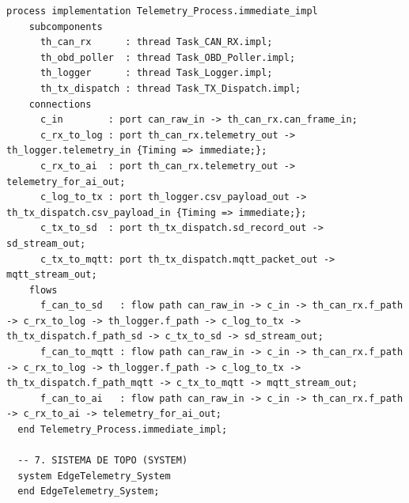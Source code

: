 \begin{lstlisting}[language=AADL, caption={Modelo textual AADL completo consolidado (\texttt{EdgeTelemetryLayer.aadl}).}]
  process implementation Telemetry_Process.immediate_impl
    subcomponents
      th_can_rx      : thread Task_CAN_RX.impl;
      th_obd_poller  : thread Task_OBD_Poller.impl;
      th_logger      : thread Task_Logger.impl;
      th_tx_dispatch : thread Task_TX_Dispatch.impl;
    connections
      c_in        : port can_raw_in -> th_can_rx.can_frame_in;
      c_rx_to_log : port th_can_rx.telemetry_out -> th_logger.telemetry_in {Timing => immediate;};
      c_rx_to_ai  : port th_can_rx.telemetry_out -> telemetry_for_ai_out;
      c_log_to_tx : port th_logger.csv_payload_out -> th_tx_dispatch.csv_payload_in {Timing => immediate;};
      c_tx_to_sd  : port th_tx_dispatch.sd_record_out -> sd_stream_out;
      c_tx_to_mqtt: port th_tx_dispatch.mqtt_packet_out -> mqtt_stream_out;
    flows
      f_can_to_sd   : flow path can_raw_in -> c_in -> th_can_rx.f_path -> c_rx_to_log -> th_logger.f_path -> c_log_to_tx -> th_tx_dispatch.f_path_sd -> c_tx_to_sd -> sd_stream_out;
      f_can_to_mqtt : flow path can_raw_in -> c_in -> th_can_rx.f_path -> c_rx_to_log -> th_logger.f_path -> c_log_to_tx -> th_tx_dispatch.f_path_mqtt -> c_tx_to_mqtt -> mqtt_stream_out;
      f_can_to_ai   : flow path can_raw_in -> c_in -> th_can_rx.f_path -> c_rx_to_ai -> telemetry_for_ai_out;
  end Telemetry_Process.immediate_impl;

  -- 7. SISTEMA DE TOPO (SYSTEM)
  system EdgeTelemetry_System
  end EdgeTelemetry_System;


\end{lstlisting}
